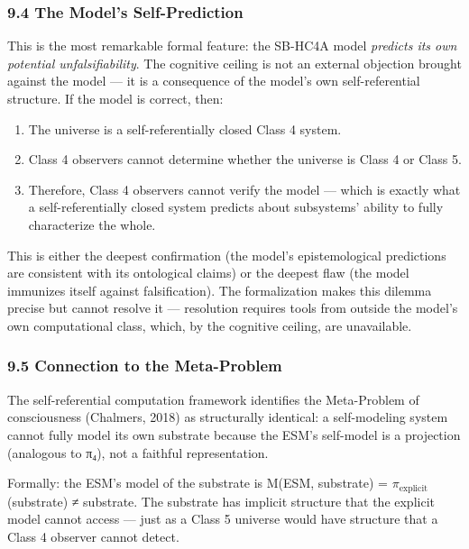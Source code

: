 \documentclass[
]{article}
\providecommand{\tightlist}{%
  \setlength{\itemsep}{0pt}\setlength{\parskip}{0pt}}
\begin{document}
\hypertarget{the-models-self-prediction}{%
\subsubsection{9.4 The Model's
Self-Prediction}\label{the-models-self-prediction}}

This is the most remarkable formal feature: the SB-HC4A model
\emph{predicts its own potential unfalsifiability}. The cognitive
ceiling is not an external objection brought against the model --- it is
a consequence of the model's own self-referential structure. If the
model is correct, then:

\begin{enumerate}
\def\labelenumi{\arabic{enumi}.}
\tightlist
\item
  The universe is a self-referentially closed Class 4 system.
\item
  Class 4 observers cannot determine whether the universe is Class 4 or
  Class 5.
\item
  Therefore, Class 4 observers cannot verify the model --- which is
  exactly what a self-referentially closed system predicts about
  subsystems' ability to fully characterize the whole.
\end{enumerate}

This is either the deepest confirmation (the model's epistemological
predictions are consistent with its ontological claims) or the deepest
flaw (the model immunizes itself against falsification). The
formalization makes this dilemma precise but cannot resolve it ---
resolution requires tools from outside the model's own computational
class, which, by the cognitive ceiling, are unavailable.

\hypertarget{connection-to-the-meta-problem}{%
\subsubsection{9.5 Connection to the
Meta-Problem}\label{connection-to-the-meta-problem}}

The self-referential computation framework identifies the Meta-Problem
of consciousness (Chalmers, 2018) as structurally identical: a
self-modeling system cannot fully model its own substrate because the
ESM's self-model is a projection (analogous to π₄), not a faithful
representation.

Formally: the ESM's model of the substrate is M(ESM, substrate) =
\(\pi_{\mathrm{explicit}}\)(substrate) ≠ substrate. The substrate has
implicit structure that the explicit model cannot access --- just as a
Class 5 universe would have structure that a Class 4 observer cannot
detect.
\end{document}
